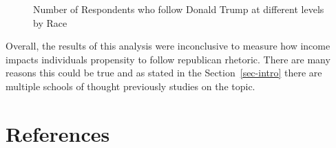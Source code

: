 \documentclass[
  letterpaper,
  DIV=11,
  numbers=noendperiod]{scrartcl}
\begin{document}
\begin{figure}


\caption{\label{fig-figure4}Number of Respondents who follow Donald
Trump at different levels by Race}

\end{figure}%

Overall, the results of this analysis were inconclusive to measure how
income impacts individuals propensity to follow republican rhetoric.
There are many reasons this could be true and as stated in the
Section~\ref{sec-intro} there are multiple schools of thought previously
studies on the topic.

\newpage

\section*{References}\label{references}
\end{document}
